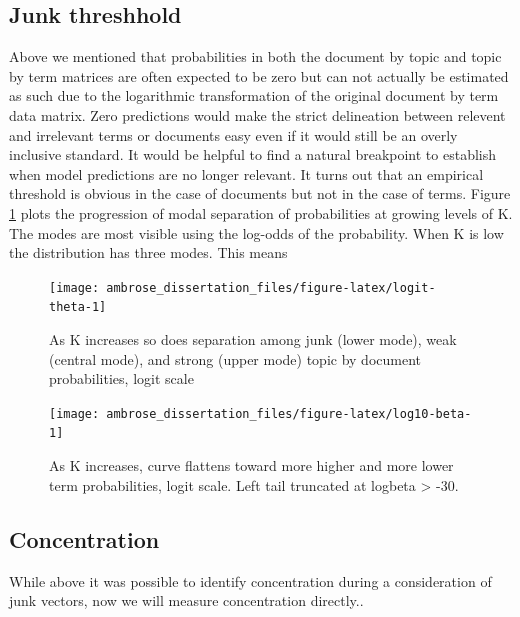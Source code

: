 \documentclass[]{book}
\theoremstyle{definition}
\theoremstyle{definition}
\theoremstyle{definition}
\theoremstyle{remark}
\begin{document}
\hypertarget{junk-threshhold}{%
\subsection{Junk threshhold}\label{junk-threshhold}}

Above we mentioned that probabilities in both the document by topic and
topic by term matrices are often expected to be zero but can not
actually be estimated as such due to the logarithmic transformation of
the original document by term data matrix. Zero predictions would make
the strict delineation between relevent and irrelevant terms or
documents easy even if it would still be an overly inclusive standard.
It would be helpful to find a natural breakpoint to establish when model
predictions are no longer relevant. It turns out that an empirical
threshold is obvious in the case of documents but not in the case of
terms. Figure \ref{fig:logit-theta} plots the progression of modal
separation of probabilities at growing levels of K. The modes are most
visible using the log-odds of the probability. When K is low the
distribution has three modes. This means

\begin{figure}

{\centering \texttt{[image: ambrose\_dissertation\_files/figure-latex/logit-theta-1]} 

}

\caption{As K increases so does separation among junk (lower mode), weak (central mode), and strong (upper mode) topic by document probabilities, logit scale}\label{fig:logit-theta}
\end{figure}

\begin{figure}

{\centering \texttt{[image: ambrose\_dissertation\_files/figure-latex/log10-beta-1]} 

}

\caption{As K increases, curve flattens toward more higher and more lower term probabilities, logit scale. Left tail truncated at logbeta > -30.}\label{fig:log10-beta}
\end{figure}

\hypertarget{concentration}{%
\subsection{Concentration}\label{concentration}}

While above it was possible to identify concentration during a
consideration of junk vectors, now we will measure concentration
directly..
\end{document}
